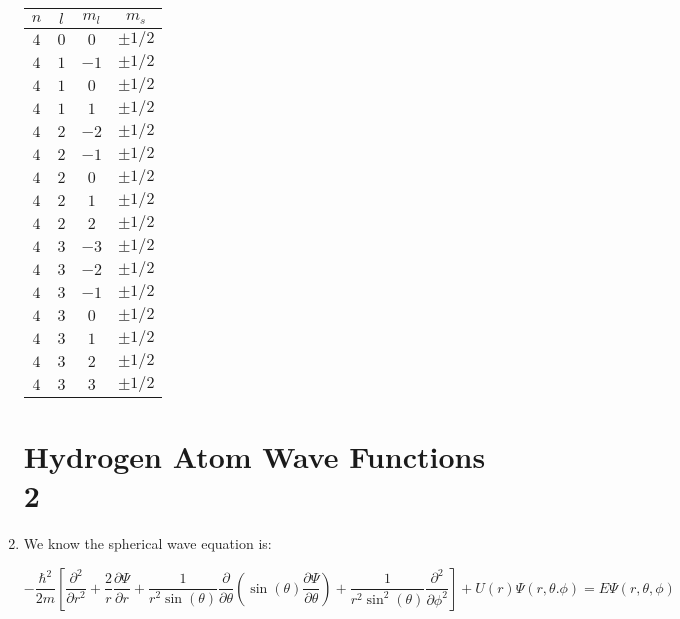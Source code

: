\begin{enumerate}
    \begin{center}
      \begin{tabular}[h!]{|c|c|c|c|}
        \hline
        $n$ & $l$ & $m_l$ & $m_s$\\
        \hline
        $4$ & $0$ & $0$ & $\pm1/2$\\
        \hline
        $4$ & $1$ & $-1$ & $\pm1/2$\\
        \hline
        $4$ & $1$ & $0$ & $\pm1/2$\\
        \hline
        $4$ & $1$ & $1$ & $\pm1/2$\\
        \hline
        $4$ & $2$ & $-2$ & $\pm1/2$\\
        \hline
        $4$ & $2$ & $-1$ & $\pm1/2$\\
        \hline
        $4$ & $2$ & $0$ & $\pm1/2$\\
        \hline
        $4$ & $2$ & $1$ & $\pm1/2$\\
        \hline
        $4$ & $2$ & $2$ & $\pm1/2$\\
        \hline
        $4$ & $3$ & $-3$ & $\pm1/2$\\
        \hline
        $4$ & $3$ & $-2$ & $\pm1/2$\\
        \hline
        $4$ & $3$ & $-1$ & $\pm1/2$\\
        \hline
        $4$ & $3$ & $0$ & $\pm1/2$\\
        \hline
        $4$ & $3$ & $1$ & $\pm1/2$\\
        \hline
        $4$ & $3$ & $2$ & $\pm1/2$\\
        \hline
        $4$ & $3$ & $3$ & $\pm1/2$\\
        \hline
      \end{tabular}
    \end{center}

    \section*{Hydrogen Atom Wave Functions 2}

  \item We know the spherical wave equation is:

    $$-\frac{\hbar^2}{2m}\left[ \frac{\partial^2}{\partial r^2}+\frac{2}{r}\frac{\partial \Psi}{\partial r}+\frac{1}{r^2\sin(\theta)}\frac{\partial}{\partial\theta}\left( \sin(\theta)\frac{\partial\Psi}{\partial\theta} \right)+\frac{1}{r^2\sin^2(\theta)}\frac{\partial^2}{\partial\phi^2} \right]+U(r)\Psi(r,\theta.\phi)=E\Psi(r,\theta,\phi)$$


\end{enumerate}

